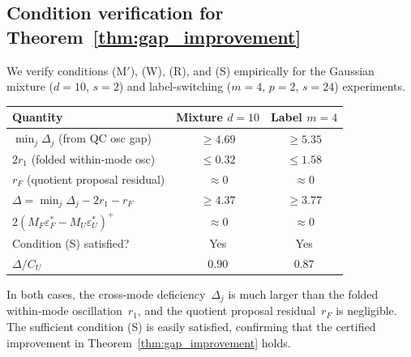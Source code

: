 \subsection{Condition verification for Theorem~\ref{thm:gap_improvement}}
\label{app:condition_check}

We verify conditions (M$'$), (W), (R), and (S) empirically
for the Gaussian mixture ($d = 10$, $s = 2$) and label-switching
($m = 4$, $p = 2$, $s = 24$) experiments.

\begin{center}
\begin{tabular}{lcc}
\hline
Quantity & Mixture $d{=}10$ & Label $m{=}4$ \\
\hline
$\min_j \Delta_j$ (from QC osc gap) & $\geq 4.69$ & $\geq 5.35$ \\
$2r_1$ (folded within-mode osc) & $\leq 0.32$ & $\leq 1.58$ \\
$r_F$ (quotient proposal residual) & $\approx 0$ & $\approx 0$ \\
$\Delta = \min_j\Delta_j - 2r_1 - r_F$ & $\geq 4.37$ & $\geq 3.77$ \\
$2(M_F\varepsilon_F^* - M_U\varepsilon_U^*)^+$ & $\approx 0$ & $\approx 0$ \\
Condition (S) satisfied? & Yes & Yes \\
$\Delta / C_U$ & $0.90$ & $0.87$ \\
\hline
\end{tabular}
\end{center}

In both cases, the cross-mode deficiency~$\Delta_j$ is much
larger than the folded within-mode oscillation~$r_1$, and the
quotient proposal residual~$r_F$ is negligible.  The sufficient
condition (S) is easily satisfied, confirming that the certified
improvement in Theorem~\ref{thm:gap_improvement} holds.
